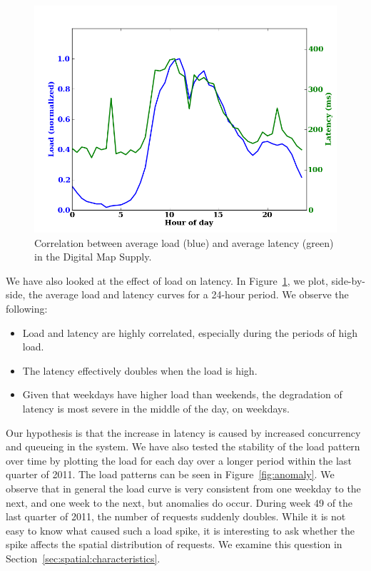 \documentclass[11pt, oneside]{report}
\begin{document}
\begin{figure}
\centering
\includegraphics[scale=0.5]{figs-tileheat/correlation.png}
\caption{Correlation between average load (blue) and average latency (green) in the Digital Map Supply.}
\label{fig:correlation}
\end{figure}

We have also looked at the effect of load on latency. In Figure~\ref{fig:correlation}, we plot, side-by-side, the average load and latency curves for a 24-hour period. We observe the following:

\begin{itemize}
\item Load and latency are highly correlated, especially during the periods of high load.
\item The latency effectively doubles when the load is high.
\item Given that weekdays have higher load than weekends, the degradation of latency is most severe in the middle of the day, on weekdays.
\end{itemize}

Our hypothesis is that the increase in latency is caused by increased concurrency and queueing in the system. We have also tested the stability of the load pattern over time by plotting the load for each day over a longer period within the last quarter of 2011. The load patterns can be seen in Figure~\ref{fig:anomaly}. We observe that in general the load curve is very consistent from one weekday to the next, and one week to the next, but anomalies do occur. During week 49 of the last quarter of 2011, the number of requests suddenly doubles. While it is not easy to know what caused such a load spike, it is interesting to ask whether the spike affects the spatial distribution of requests. We examine this question in Section~\ref{sec:spatial:characteristics}.
\end{document}

